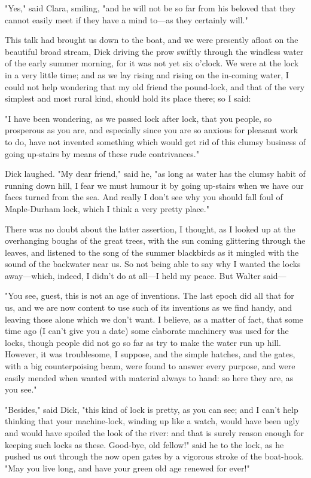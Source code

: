 "Yes," said Clara, smiling, "and he will not be so far from his beloved
that they cannot easily meet if they have a mind to---as they certainly
will."

This talk had brought us down to the boat, and we were presently afloat
on the beautiful broad stream, Dick driving the prow swiftly through the
windless water of the early summer morning, for it was not yet six
o'clock. We were at the lock in a very little time; and as we lay rising
and rising on the in-coming water, I could not help wondering that my
old friend the pound-lock, and that of the very simplest and most rural
kind, should hold its place there; so I said:

"I have been wondering, as we passed lock after lock, that you people,
so prosperous as you are, and especially since you are so anxious for
pleasant work to do, have not invented something which would get rid of
this clumsy business of going up-stairs by means of these rude
contrivances."

Dick laughed. "My dear friend," said he, "as long as water has the
clumsy habit of running down hill, I fear we must humour it by going
up-stairs when we have our faces turned from the sea. And really I don't
see why you should fall foul of Maple-Durham lock, which I think a very
pretty place."

There was no doubt about the latter assertion, I thought, as I looked up
at the overhanging boughs of the great trees, with the sun coming
glittering through the leaves, and listened to the song of the summer
blackbirds as it mingled with the sound of the backwater near us. So not
being able to say why I wanted the locks away---which, indeed, I didn't
do at all---I held my peace. But Walter said---

"You see, guest, this is not an age of inventions. The last epoch did
all that for us, and we are now content to use such of its inventions as
we find handy, and leaving those alone which we don't want. I believe,
as a matter of fact, that some time ago (I can't give you a date) some
elaborate machinery was used for the locks, though people did not go so
far as try to make the water run up hill. However, it was troublesome, I
suppose, and the simple hatches, and the gates, with a big
counterpoising beam, were found to answer every purpose, and were easily
mended when wanted with material always to hand: so here they are, as
you see."

"Besides," said Dick, "this kind of lock is pretty, as you can see; and
I can't help thinking that your machine-lock, winding up like a watch,
would have been ugly and would have spoiled the look of the river: and
that is surely reason enough for keeping such locks as these. Good-bye,
old fellow!" said he to the lock, as he pushed us out through the now
open gates by a vigorous stroke of the boat-hook. "May you live long,
and have your green old age renewed for ever!"


